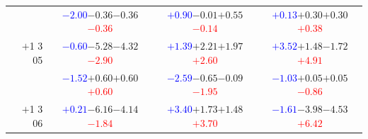 \documentclass[compress]{beamer}
\begin{document}
\begin{frame}
\begin{tabular}{r | c | c | c}
          & \textcolor{blue}{$-2.00$}\hspace{0.1 cm}$-0.36$\hspace{0.1 cm}$-0.36$\hspace{0.1 cm}\textcolor{red}{$-0.36$} & \textcolor{blue}{$+0.90$}\hspace{0.1 cm}$-0.01$\hspace{0.1 cm}$+0.55$\hspace{0.1 cm}\textcolor{red}{$-0.14$} & \textcolor{blue}{$+0.13$}\hspace{0.1 cm}$+0.30$\hspace{0.1 cm}$+0.30$\hspace{0.1 cm}\textcolor{red}{$+0.38$} \\
$+$1 3 05 & \textcolor{blue}{$-0.60$}\hspace{0.1 cm}$-5.28$\hspace{0.1 cm}$-4.32$\hspace{0.1 cm}\textcolor{red}{$-2.90$} & \textcolor{blue}{$+1.39$}\hspace{0.1 cm}$+2.21$\hspace{0.1 cm}$+1.97$\hspace{0.1 cm}\textcolor{red}{$+2.60$} & \textcolor{blue}{$+3.52$}\hspace{0.1 cm}$+1.48$\hspace{0.1 cm}$-1.72$\hspace{0.1 cm}\textcolor{red}{$+4.91$} \\
          & \textcolor{blue}{$-1.52$}\hspace{0.1 cm}$+0.60$\hspace{0.1 cm}$+0.60$\hspace{0.1 cm}\textcolor{red}{$+0.60$} & \textcolor{blue}{$-2.59$}\hspace{0.1 cm}$-0.65$\hspace{0.1 cm}$-0.09$\hspace{0.1 cm}\textcolor{red}{$-1.95$} & \textcolor{blue}{$-1.03$}\hspace{0.1 cm}$+0.05$\hspace{0.1 cm}$+0.05$\hspace{0.1 cm}\textcolor{red}{$-0.86$} \\
$+$1 3 06 & \textcolor{blue}{$+0.21$}\hspace{0.1 cm}$-6.16$\hspace{0.1 cm}$-4.14$\hspace{0.1 cm}\textcolor{red}{$-1.84$} & \textcolor{blue}{$+3.40$}\hspace{0.1 cm}$+1.73$\hspace{0.1 cm}$+1.48$\hspace{0.1 cm}\textcolor{red}{$+3.70$} & \textcolor{blue}{$-1.61$}\hspace{0.1 cm}$-3.98$\hspace{0.1 cm}$-4.53$\hspace{0.1 cm}\textcolor{red}{$+6.42$} \\

\end{tabular}
\end{frame}
\end{document}
